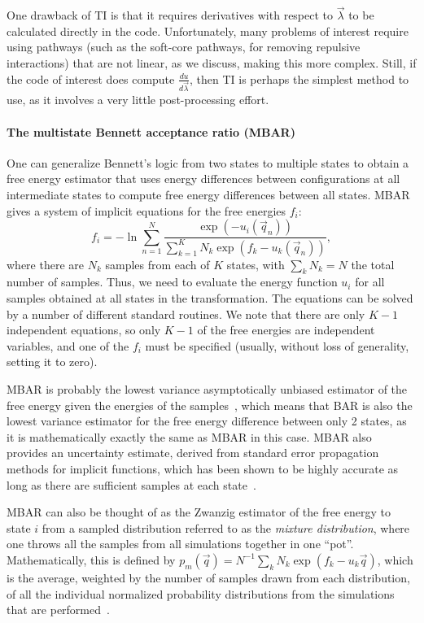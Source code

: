 \documentclass[9pt,bestpractices]{livecoms}
\begin{document}
One drawback of TI is that it requires derivatives with respect to $\vec{\lambda}$ to be calculated directly in the code. Unfortunately, many problems of interest require using pathways (such as the soft-core pathways, for removing repulsive interactions) that are not linear, as we discuss, making this more complex. Still, if the code of interest does compute $\frac{du}{d\vec{\lambda}}$, then TI is perhaps the simplest method to use, as it involves a very little post-processing effort.

\paragraph{The multistate Bennett acceptance ratio (MBAR)}
One can generalize Bennett's logic from two states to multiple states to obtain a free energy estimator that uses energy differences between configurations at all intermediate states to compute free energy differences between all states. MBAR gives a system of implicit equations for the free energies $f_i$:
\begin{equation}
f_i = - \ln \sum_{n=1}^{N} \frac{\exp(-u_i(\vec{q}_n))}{\sum_{k=1}^K N_k \exp(f_k-u_k(\vec{q}_n))},
\end{equation}
where there are $N_k$ samples from each of $K$ states, with $\sum_k N_k=N$ the total number of samples. Thus, we need to evaluate the energy function $u_i$ for all samples obtained at all states in the transformation. The equations can be solved by a number of different standard routines. We note that there are only $K-1$ independent equations, so only $K-1$ of the free energies are independent variables, and one of the $f_i$ must be specified (usually, without loss of generality, setting it to zero).

MBAR is probably the lowest variance asymptotically unbiased estimator of the free energy given the energies of the samples~\cite{tan2004likelihood}, which means that BAR is also the lowest variance estimator for the free energy difference between only 2 states, as it is mathematically exactly the same as MBAR in this case. MBAR also provides an uncertainty estimate, derived from standard error propagation methods for implicit functions, which has been shown to be highly accurate as long as there are sufficient samples at each state~\cite{paliwal2011benchmark}.

MBAR can also be thought of as the Zwanzig estimator of the free energy to state $i$ from a sampled distribution referred to as the \textit{mixture distribution}, where one throws all the samples from all simulations together in one ``pot''. Mathematically, this is defined by $p_m(\vec{q}) = N^{-1} \sum_k N_k \exp(f_k-u_k\vec{q})$, which is the average, weighted by the number of samples drawn from each distribution, of all the individual normalized probability distributions from the simulations that are performed~\cite{shirts2017reweighting}.
\end{document}
